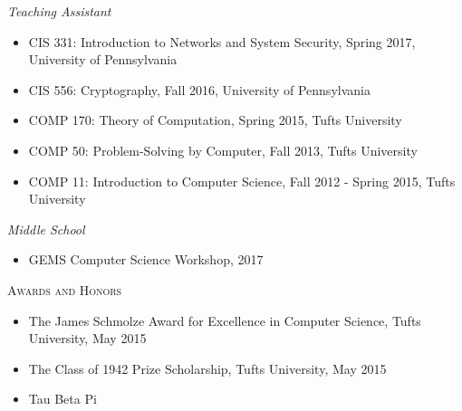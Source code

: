 \documentclass{article}
\begin{document}
\textit{Teaching Assistant}
\begin{itemize}[label={},noitemsep]
\item CIS 331: Introduction to Networks and System Security, Spring 2017, University of Pennsylvania
\item CIS 556: Cryptography, Fall 2016, University of Pennsylvania
\item COMP 170: Theory of Computation, Spring 2015, Tufts University
\item COMP 50: Problem-Solving by Computer, Fall 2013, Tufts University
\item COMP 11: Introduction to Computer Science, Fall 2012 - Spring 2015, Tufts University
\end{itemize}

\textit{Middle School}
\begin{itemize}[label={},noitemsep]
\item GEMS Computer Science Workshop, 2017
\end{itemize}

\textsc{Awards and Honors}
\begin{itemize}[label={}]
\item The James Schmolze Award for Excellence in Computer Science, Tufts University, May 2015
\item The Class of 1942 Prize Scholarship, Tufts University, May 2015
\item Tau Beta Pi
\end{itemize}
\end{document}
